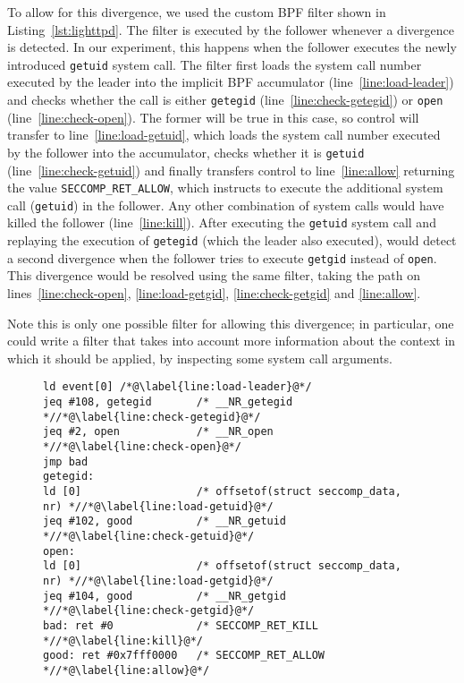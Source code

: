 To allow for this divergence, we used the custom BPF filter shown in
Listing~\ref{lst:lighttpd}.  The filter is executed by the
follower whenever a divergence is detected.  In our experiment, this
happens when the follower executes the newly introduced
\lstinline`getuid` system call. The filter first loads the system call
number executed by the leader into the implicit BPF accumulator
(line~\ref{line:load-leader}) and checks whether the call is either
\lstinline`getegid` (line~\ref{line:check-getegid}) or
\lstinline`open` (line~\ref{line:check-open}).  The former will be
true in this case, so control will transfer to
line~\ref{line:load-getuid}, which loads the system call number
executed by the follower into the accumulator, checks whether it is
\lstinline`getuid` (line~\ref{line:check-getuid}) and finally
transfers control to line~\ref{line:allow} returning the value
\lstinline`SECCOMP_RET_ALLOW`, which instructs \varan to execute the
additional system call (\ie \lstinline`getuid`) in the follower.  Any
other combination of system calls would have killed the follower
(line~\ref{line:kill}). After executing the \lstinline`getuid` system
call and replaying the execution of \lstinline`getegid` (which the
leader also executed), \varan would detect a second divergence when
the follower tries to execute \lstinline`getgid` instead of
\lstinline`open`. This divergence would be resolved using the same
filter, taking the path on lines~\ref{line:check-open},
\ref{line:load-getgid}, \ref{line:check-getgid} and \ref{line:allow}.

Note this is only one possible filter for allowing this divergence; in
particular, one could write a filter that takes into account more
information about the context in which it should be applied, \eg by
inspecting some system call arguments.



\begin{figure}[t]
\begin{lstlisting}[label={lst:lighttpd},language={[bpf]Assembler},caption={Example of a BPF rewriting rule.}]
ld event[0] /*@\label{line:load-leader}@*/
jeq #108, getegid       /* __NR_getegid *//*@\label{line:check-getegid}@*/
jeq #2, open            /* __NR_open *//*@\label{line:check-open}@*/
jmp bad
getegid:
ld [0]                  /* offsetof(struct seccomp_data, nr) *//*@\label{line:load-getuid}@*/
jeq #102, good          /* __NR_getuid *//*@\label{line:check-getuid}@*/
open:
ld [0]                  /* offsetof(struct seccomp_data, nr) *//*@\label{line:load-getgid}@*/
jeq #104, good          /* __NR_getgid *//*@\label{line:check-getgid}@*/
bad: ret #0             /* SECCOMP_RET_KILL *//*@\label{line:kill}@*/
good: ret #0x7fff0000   /* SECCOMP_RET_ALLOW *//*@\label{line:allow}@*/
\end{lstlisting}
\end{figure}

